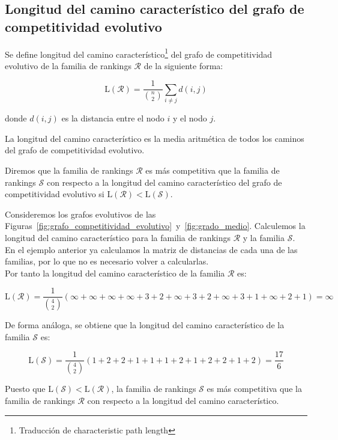 \subsection*{Longitud del camino característico del grafo de competitividad evolutivo}

\begin{defi}
Se define longitud del camino característico\footnote{Traducción de characteristic path length} del grafo de competitividad evolutivo de la familia de rankings $\mathcal{R}$ de la siguiente forma:

\begin{equation}
\mathrm{L}(\mathcal{R}) = \dfrac{1}{\binom{n}{2}} \sum_{i\neq j} d(i,j)
\end{equation}

donde $d(i,j)$ es la distancia entre el nodo $i$ y el nodo $j$.
\end{defi}

La longitud del camino característico es la media aritmética de todos los caminos del grafo de competitividad evolutivo.

\begin{defi}
Diremos que la familia de rankings $\mathcal{R}$ es más competitiva que la familia de rankings $\mathcal{S}$ con respecto a la longitud del camino característico del grafo de competitividad evolutivo si $\mathrm{L}(\mathcal{R}) < \mathrm{L}(\mathcal{S})$.
\end{defi}

\begin{ejemplo}
Consideremos los grafos evolutivos de las Figuras~\ref{fig:grafo_competitividad_evolutivo}~y~\ref{fig:grado_medio}. Calculemos la longitud del camino característico para la familia de rankings $\mathcal{R}$ y la familia $\mathcal{S}$.\\

En el ejemplo anterior ya calculamos la matriz de distancias de cada una de las familias, por lo que no es necesario volver a calcularlas.\\

Por tanto la longitud del camino característico de la familia $\mathcal{R}$ es:

\begin{equation*}
\mathrm{L}(\mathcal{R}) = \dfrac{1}{\binom{4}{2}} \left( \infty + \infty + \infty + \infty + 3 + 2 + \infty + 3 + 2 + \infty + 3 + 1 + \infty + 2 + 1 \right) = \infty
\end{equation*}

De forma análoga, se obtiene que la longitud del camino característico de la familia $\mathcal{S}$ es:

\begin{equation*}
\mathrm{L}(\mathcal{S}) = \dfrac{1}{\binom{4}{2}} \left( 1 + 2 + 2 + 1 + 1 + 1 + 2 + 1  + 2 + 2 + 1 + 2  \right) =  \dfrac{17}{6} 
\end{equation*}

Puesto que $\mathrm{L}(\mathcal{S}) < \mathrm{L}(\mathcal{R})$, la familia de rankings $\mathcal{S}$ es más competitiva que la familia de rankings $\mathcal{R}$ con respecto a la longitud del camino característico.

\end{ejemplo}